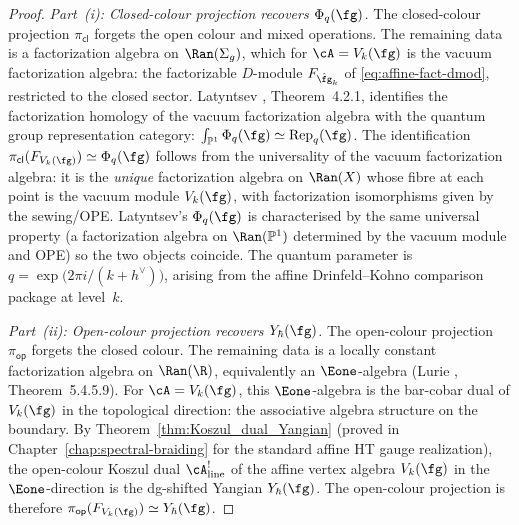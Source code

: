 \begin{proof}
\emph{Part~(i): Closed-colour projection recovers $\Phi_q(\fg)$.}
The closed-colour projection $\pi_{\mathsf{cl}}$ forgets the
open colour and mixed operations. The remaining data is a
factorization algebra on $\Ran(\Sigma_g)$, which for
$\cA = V_k(\fg)$ is the vacuum factorization algebra:
the factorizable $D$-module $F_{\hat\fg_k}$ of
\eqref{eq:affine-fact-dmod}, restricted to the closed sector.
Latyntsev \cite{Latyntsev23}, Theorem~4.2.1, identifies the
factorization homology of the vacuum factorization algebra with the
quantum group representation category:
$\int_{\mathbb{P}^1} \Phi_q(\fg) \simeq \operatorname{Rep}_q(\fg)$.
The identification $\pi_{\mathsf{cl}}(F_{V_k(\fg)}) \simeq
\Phi_q(\fg)$ follows from the universality of the vacuum
factorization algebra: it is the \emph{unique} factorization
algebra on $\Ran(X)$ whose fibre at each point is the vacuum
module $V_k(\fg)$, with factorization isomorphisms given by
the sewing/OPE. Latyntsev's $\Phi_q(\fg)$ is characterised by
the same universal property (a factorization algebra on
$\Ran(\mathbb{P}^1)$ determined by the vacuum module and OPE)
so the two objects coincide. The quantum parameter is
$q = \exp\!\bigl(2\pi i/(k+h^\vee)\bigr)$, arising from the
affine Drinfeld--Kohno comparison package at level~$k$.

\smallskip\noindent
\emph{Part~(ii): Open-colour projection recovers $Y_\hbar(\fg)$.}
The open-colour projection $\pi_{\mathsf{op}}$ forgets the closed
colour. The remaining data is a locally constant factorization
algebra on $\Ran(\R)$, equivalently an $\Eone$-algebra
(Lurie \cite{HA}, Theorem~5.4.5.9). For $\cA = V_k(\fg)$,
this $\Eone$-algebra is the bar-cobar dual of $V_k(\fg)$ in
the topological direction: the associative algebra structure
on the boundary. By Theorem~\ref{thm:Koszul_dual_Yangian}
\textup{(}proved in Chapter~\ref{chap:spectral-braiding} for the
standard affine HT gauge realization\textup{)}, the open-colour
Koszul dual $\cA^!_{\mathrm{line}}$ of the affine vertex algebra
$V_k(\fg)$ in the $\Eone$-direction is the dg-shifted Yangian
$Y_\hbar(\fg)$.
The open-colour projection is therefore
$\pi_{\mathsf{op}}(F_{V_k(\fg)}) \simeq Y_\hbar(\fg)$.


\end{proof}

